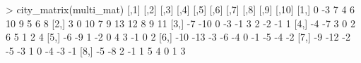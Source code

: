\documentclass[
]{article}
\newenvironment{Shaded}{\begin{snugshade}}{\end{snugshade}}
\newcommand{\DecValTok}[1]{\textcolor[rgb]{0.00,0.00,0.81}{#1}}
\newcommand{\FunctionTok}[1]{\textcolor[rgb]{0.00,0.00,0.00}{#1}}
\newcommand{\NormalTok}[1]{#1}
\newcommand{\SpecialCharTok}[1]{\textcolor[rgb]{0.00,0.00,0.00}{#1}}
\begin{document}
\begin{Shaded}
\begin{Highlighting}[]
\SpecialCharTok{\textgreater{}} \FunctionTok{city\_matrix}\NormalTok{(multi\_mat)}
\NormalTok{      [,}\DecValTok{1}\NormalTok{] [,}\DecValTok{2}\NormalTok{] [,}\DecValTok{3}\NormalTok{] [,}\DecValTok{4}\NormalTok{] [,}\DecValTok{5}\NormalTok{] [,}\DecValTok{6}\NormalTok{] [,}\DecValTok{7}\NormalTok{] [,}\DecValTok{8}\NormalTok{] [,}\DecValTok{9}\NormalTok{] [,}\DecValTok{10}\NormalTok{]}
\NormalTok{ [}\DecValTok{1}\NormalTok{,]    }\DecValTok{0}   \SpecialCharTok{{-}}\DecValTok{3}    \DecValTok{7}    \DecValTok{4}    \DecValTok{6}   \DecValTok{10}    \DecValTok{9}    \DecValTok{5}    \DecValTok{6}     \DecValTok{8}
\NormalTok{ [}\DecValTok{2}\NormalTok{,]    }\DecValTok{3}    \DecValTok{0}   \DecValTok{10}    \DecValTok{7}    \DecValTok{9}   \DecValTok{13}   \DecValTok{12}    \DecValTok{8}    \DecValTok{9}    \DecValTok{11}
\NormalTok{ [}\DecValTok{3}\NormalTok{,]   }\SpecialCharTok{{-}}\DecValTok{7}  \SpecialCharTok{{-}}\DecValTok{10}    \DecValTok{0}   \SpecialCharTok{{-}}\DecValTok{3}   \SpecialCharTok{{-}}\DecValTok{1}    \DecValTok{3}    \DecValTok{2}   \SpecialCharTok{{-}}\DecValTok{2}   \SpecialCharTok{{-}}\DecValTok{1}     \DecValTok{1}
\NormalTok{ [}\DecValTok{4}\NormalTok{,]   }\SpecialCharTok{{-}}\DecValTok{4}   \SpecialCharTok{{-}}\DecValTok{7}    \DecValTok{3}    \DecValTok{0}    \DecValTok{2}    \DecValTok{6}    \DecValTok{5}    \DecValTok{1}    \DecValTok{2}     \DecValTok{4}
\NormalTok{ [}\DecValTok{5}\NormalTok{,]   }\SpecialCharTok{{-}}\DecValTok{6}   \SpecialCharTok{{-}}\DecValTok{9}    \DecValTok{1}   \SpecialCharTok{{-}}\DecValTok{2}    \DecValTok{0}    \DecValTok{4}    \DecValTok{3}   \SpecialCharTok{{-}}\DecValTok{1}    \DecValTok{0}     \DecValTok{2}
\NormalTok{ [}\DecValTok{6}\NormalTok{,]  }\SpecialCharTok{{-}}\DecValTok{10}  \SpecialCharTok{{-}}\DecValTok{13}   \SpecialCharTok{{-}}\DecValTok{3}   \SpecialCharTok{{-}}\DecValTok{6}   \SpecialCharTok{{-}}\DecValTok{4}    \DecValTok{0}   \SpecialCharTok{{-}}\DecValTok{1}   \SpecialCharTok{{-}}\DecValTok{5}   \SpecialCharTok{{-}}\DecValTok{4}    \SpecialCharTok{{-}}\DecValTok{2}
\NormalTok{ [}\DecValTok{7}\NormalTok{,]   }\SpecialCharTok{{-}}\DecValTok{9}  \SpecialCharTok{{-}}\DecValTok{12}   \SpecialCharTok{{-}}\DecValTok{2}   \SpecialCharTok{{-}}\DecValTok{5}   \SpecialCharTok{{-}}\DecValTok{3}    \DecValTok{1}    \DecValTok{0}   \SpecialCharTok{{-}}\DecValTok{4}   \SpecialCharTok{{-}}\DecValTok{3}    \SpecialCharTok{{-}}\DecValTok{1}
\NormalTok{ [}\DecValTok{8}\NormalTok{,]   }\SpecialCharTok{{-}}\DecValTok{5}   \SpecialCharTok{{-}}\DecValTok{8}    \DecValTok{2}   \SpecialCharTok{{-}}\DecValTok{1}    \DecValTok{1}    \DecValTok{5}    \DecValTok{4}    \DecValTok{0}    \DecValTok{1}     \DecValTok{3}

\end{Highlighting}
\end{Shaded}
\end{document}
